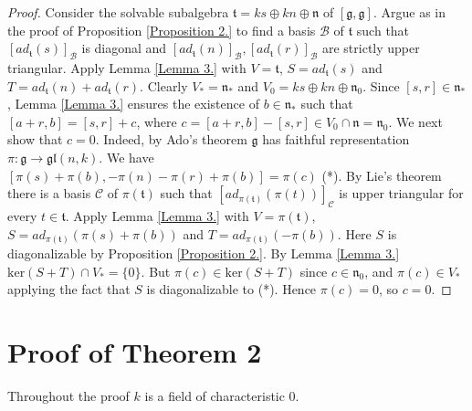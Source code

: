 \documentclass{amsart}
\theoremstyle{definition}
\theoremstyle{remark}
\numberwithin{equation}{section}
\newcommand \g{{\mathfrak g}}
\def \n{{\mathfrak n}}
\renewcommand \t{{\mathfrak t}}
\newcommand \D{{\mathcal C}}
\newcommand \gl{{\mathfrak {gl}}}
\newcommand \B{{\mathcal B}}
\begin{document}
\begin{proof}
 Consider the solvable subalgebra $\t=k s \oplus k n\oplus \n$ of $[\g,\g]$.
Argue as in the proof of Proposition \ref{Proposition 2.} to find a basis $\B$ of $\t$ such that $[ad_\t(s)]_\B$
is diagonal and $[ad_\t(n)]_\B, [ad_\t(r)]_\B $ are strictly upper triangular.
Apply Lemma \ref{Lemma 3.} with $V=\t$, $S=ad_\t(s)$ and $T=ad_\t(n)+ad_\t(r)$. Clearly $V_*=\n_*$ and
$V_0=k s\oplus k n\oplus \n_0$. Since $[s,r]\in \n_*$, Lemma \ref{Lemma 3.} ensures the existence of $b\in \n_*$
such that $[a+r,b]=[s,r]+c$, where $c=[a+r,b]-[s,r]\in V_0\cap \n=\n_0$. We next show that $c=0$.
Indeed, by Ado's theorem $\g$ has faithful representation $\pi:\g\to\gl(n,k)$. We have
$[\pi(s)+\pi(b),-\pi(n)-\pi(r)+\pi(b)]=\pi(c)$ (*). By Lie's theorem there is a basis
$\D$ of $\pi(\t)$ such that
$[ad_{\pi(\t)}(\pi(t))]_\D$ is upper triangular for every $t\in\t$.
Apply Lemma \ref{Lemma 3.} with $V=\pi(\t)$, $S=ad_{\pi(\t)}(\pi(s)+\pi(b))$ and $T=ad_{\pi(\t)}(-\pi(b))$.
Here
$S$ is diagonalizable by Proposition \ref{Proposition 2.}. By Lemma \ref{Lemma 3.}
$\mathrm{ker}(S+T)\cap V_*=\{0\}$. But $\pi(c)\in \mathrm{ker}(S+T)$ since $c\in \n_0$, and
$\pi(c)\in V_*$ applying the fact that $S$ is diagonalizable to (*). Hence $\pi(c)=0$, so $c=0$.
\end{proof}

\section{Proof of Theorem 2}

Throughout the proof $k$ is a field of characteristic 0.
\end{document}
